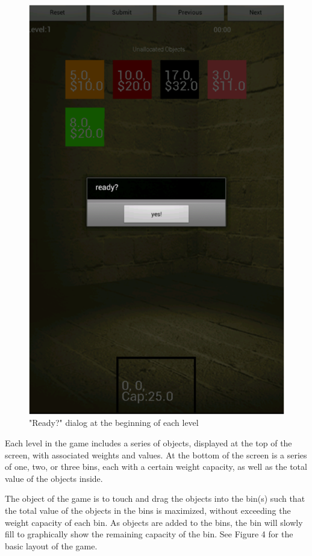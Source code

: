 \documentclass[11pt]{article}
\begin{document}
\begin{figure}[h]
\centering
\includegraphics[scale=0.65]{level_start.png}
\caption{"Ready?" dialog at the beginning of each level}
\end{figure}

Each level in the game includes a series of objects, displayed at the top of the
screen, with associated weights and values.  At the bottom of the screen is a
series of one, two, or three bins, each with a certain weight capacity, as well
as the total value of the objects inside.

The object of the game is to touch and drag the objects into the bin(s) such
that the total value of the objects in the bins is maximized, without exceeding
the weight capacity of each bin.  As objects are added to the bins, the bin
will slowly fill to graphically show the remaining capacity of the bin.  See
Figure 4 for the basic layout of the game.
\end{document}
